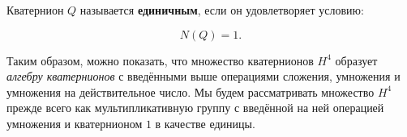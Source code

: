 \begin{definition}
Кватернион $Q$ называется \textbf{единичным}, если он удовлетворяет условию:

$$
N(Q)=1.
$$
\end{definition}

Таким образом, можно показать, что множество кватернионов $H^4$ образует \textit{алгебру кватернионов} с введёнными
выше операциями сложения, умножения и умножения на действительное число. Мы будем рассматривать множество $H^4$
прежде всего как мультипликативную группу с введённой на ней операцией умножения и кватернионом $1$ в качестве единицы.
